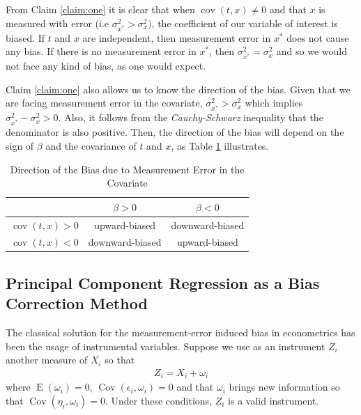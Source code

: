 \documentclass[10pt]{article}
\def\b{\beta}
\begin{document}
       From Claim \ref{claim:one} it is clear that when $\operatorname{cov}(t,x)\neq 0$ and that $x$ is measured with error (i.e $\sigma_{x^*}^2>\sigma_x^2)$, the coefficient of our variable of interest is biased. If $t$ and $x$ are independent, then measurement error in $x^*$ does not cause any bias. If there is no measurement error in $x^*$, then $\sigma^2_{x^*}=\sigma^2_x$ and so we would not face any kind of bias, as one would expect.
        
        Claim \ref{claim:one} also allows us to know the direction of the bias. Given that we are facing measurement error in the covariate, $\sigma^2_{x^*}>\sigma^2_x$ which implies $\sigma^2_{x^*}-\sigma^2_x>0$. Also, it follows from the \textit{Cauchy-Schwarz} inequality that the denominator is also positive. Then, the direction of the bias will depend on the sign of $\beta$ and the covariance of $t$ and $x$, as Table \ref{bias_direction} illustrates.
        
        \begin{table}[H]
            \centering
            \caption{Direction of the Bias due to Measurement Error in the Covariate}
            \label{bias_direction}
            \begin{tabular}{|c|c|c|}\hline \hline
              & $\b>0$  & $\b<0$ \\ \hline
             $\operatorname{cov}(t,x)>0$ & upward-biased & downward-biased \\ \hline
             $\operatorname{cov}(t,x)<0$ & downward-biased & upward-biased \\ \hline
            \end{tabular} 
        \end{table}
        
    \subsection*{Principal Component Regression as a Bias Correction Method}
        
        The classical solution for the measurement-error induced bias in econometrics has been the usage of instrumental variables. Suppose we use as an instrument $Z_i$ another measure of $X_i$ so that
        \begin{align}
            Z_i=X_i+\omega_i
        \end{align}
        where $\operatorname{E}(\omega_i)=0$, $\operatorname{Cov}(\epsilon_i,\omega_i)=0$ and that $\omega_i$ brings new information so that $\operatorname{Cov}(\eta_i,\omega_i)=0$.  Under these conditions, $Z_i$ is a valid instrument.
\end{document}
